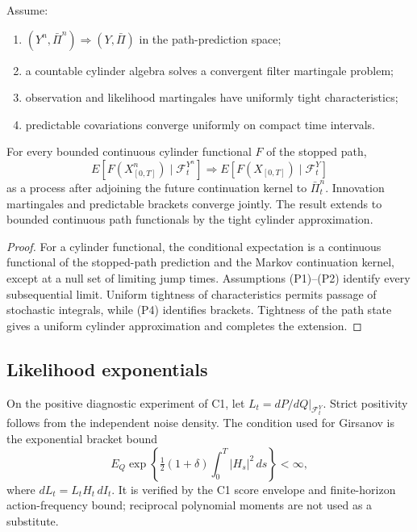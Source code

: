 Assume:
\begin{enumerate}[label=(P\arabic*)]
\item $(Y^n,\bar\Pi^n)\Rightarrow(Y,\bar\Pi)$ in the path-prediction space;
\item a countable cylinder algebra solves a convergent filter martingale
      problem;
\item observation and likelihood martingales have uniformly tight
      characteristics;
\item predictable covariations converge uniformly on compact time intervals.
\end{enumerate}

\begin{theorem}
\label{thm:r27-c2-optional}
For every bounded continuous cylinder functional $F$ of the stopped path,
\[
 E[F(X^n_{[0,T]})\mid\mathcal F_t^{Y^n}]
 \Rightarrow
 E[F(X_{[0,T]})\mid\mathcal F_t^{Y}]                      \tag{C2.8}
\]
as a process after adjoining the future continuation kernel to
$\bar\Pi_t^n$.  Innovation martingales and predictable brackets converge
jointly.  The result extends to bounded continuous path functionals by the
tight cylinder approximation.
\end{theorem}

\begin{proof}
For a cylinder functional, the conditional expectation is a continuous
functional of the stopped-path prediction and the Markov continuation kernel,
except at a null set of limiting jump times.  Assumptions (P1)--(P2) identify
every subsequential limit.  Uniform tightness of characteristics permits
passage of stochastic integrals, while (P4) identifies brackets.  Tightness of
the path state gives a uniform cylinder approximation and completes the
extension.
\end{proof}

\subsection{Likelihood exponentials}

On the positive diagnostic experiment of C1, let
$L_t=dP/dQ|_{\mathcal F_t^Y}$.  Strict positivity follows from the independent
noise density.  The condition used for Girsanov is the exponential bracket
bound
\[
 E_Q\exp\left\{\tfrac12(1+\delta)
 \int_0^T|H_s|^2\,ds\right\}<\infty,                      \tag{C2.9}
\]
where $dL_t=L_tH_t\,dI_t$.  It is verified by the C1 score envelope and
finite-horizon action-frequency bound; reciprocal polynomial moments are not
used as a substitute.

